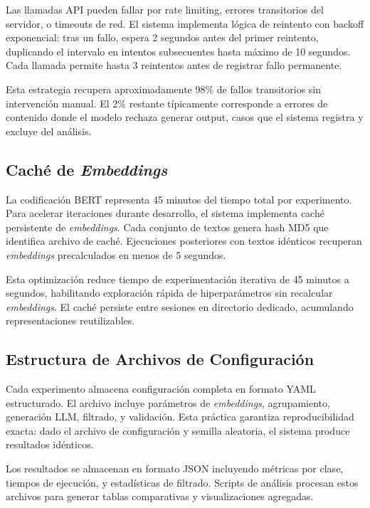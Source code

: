 Las llamadas API pueden fallar por rate limiting, errores transitorios del servidor, o timeouts de red. El sistema implementa lógica de reintento con backoff exponencial: tras un fallo, espera 2 segundos antes del primer reintento, duplicando el intervalo en intentos subsecuentes hasta máximo de 10 segundos. Cada llamada permite hasta 3 reintentos antes de registrar fallo permanente.

Esta estrategia recupera aproximadamente 98\% de fallos transitorios sin intervención manual. El 2\% restante típicamente corresponde a errores de contenido donde el modelo rechaza generar output, casos que el sistema registra y excluye del análisis.

\subsection{Caché de \textit{Embeddings}}
\label{subsec:cache}

La codificación BERT representa 45 minutos del tiempo total por experimento. Para acelerar iteraciones durante desarrollo, el sistema implementa caché persistente de \textit{embeddings}. Cada conjunto de textos genera hash MD5 que identifica archivo de caché. Ejecuciones posteriores con textos idénticos recuperan \textit{embeddings} precalculados en menos de 5 segundos.

Esta optimización reduce tiempo de experimentación iterativa de 45 minutos a segundos, habilitando exploración rápida de hiperparámetros sin recalcular \textit{embeddings}. El caché persiste entre sesiones en directorio dedicado, acumulando representaciones reutilizables.

\subsection{Estructura de Archivos de Configuración}
\label{subsec:config_files}

Cada experimento almacena configuración completa en formato YAML estructurado. El archivo incluye parámetros de \textit{embeddings}, agrupamiento, generación LLM, filtrado, y validación. Esta práctica garantiza reproducibilidad exacta: dado el archivo de configuración y semilla aleatoria, el sistema produce resultados idénticos.

Los resultados se almacenan en formato JSON incluyendo métricas por clase, tiempos de ejecución, y estadísticas de filtrado. Scripts de análisis procesan estos archivos para generar tablas comparativas y visualizaciones agregadas.

